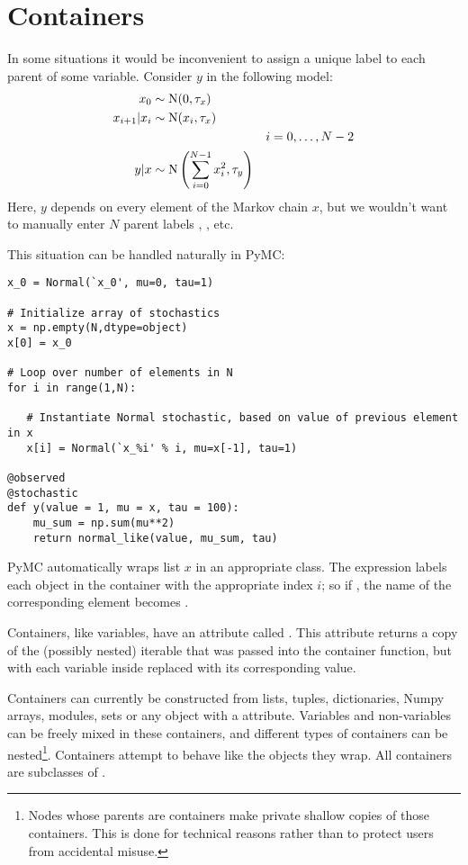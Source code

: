 \hypertarget{container}{}
\section{Containers} \label{container}

In some situations it would be inconvenient to assign a unique label to each parent of some variable. Consider $y$ in the following model:
\begin{align*}
    x_0 &\sim \textup N (0,\tau_x)\\
    x_{i+1}|x_i &\sim \textup{N}(x_i, \tau_x)\\
    &&i=0,\ldots, N-2\\
    y|x &\sim \textup N \left(\sum_{i=0}^{N-1}x_i^2,\tau_y\right)
\end{align*}
Here, $y$ depends on every element of the Markov chain $x$, but we wouldn't want to manually enter $N$ parent labels , , etc.

This situation can be handled naturally in PyMC:
\begin{verbatim}
x_0 = Normal(`x_0', mu=0, tau=1)

# Initialize array of stochastics
x = np.empty(N,dtype=object)
x[0] = x_0

# Loop over number of elements in N
for i in range(1,N):

   # Instantiate Normal stochastic, based on value of previous element in x
   x[i] = Normal(`x_%i' % i, mu=x[-1], tau=1)

@observed
@stochastic
def y(value = 1, mu = x, tau = 100):
    mu_sum = np.sum(mu**2)
    return normal_like(value, mu_sum, tau)
\end{verbatim}
PyMC automatically wraps list $x$ in an appropriate  class. The  expression  labels each  object in the container with the appropriate index $i$; so if , the name of the corresponding element becomes .

Containers, like variables, have an attribute called . This attribute returns a copy of the (possibly nested) iterable that was passed into the container function, but with each variable inside replaced with its corresponding value.

Containers can currently be constructed from lists, tuples, dictionaries, Numpy arrays, modules, sets or any object with a  attribute. Variables and non-variables can be freely mixed in these containers, and different types of containers can be nested\footnote{Nodes whose parents are containers make private shallow copies of those containers. This is done for technical reasons rather than to protect users from accidental misuse.}. Containers attempt to behave like the objects they wrap. All containers are subclasses of .

